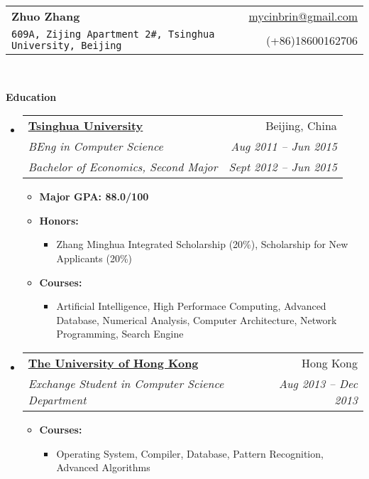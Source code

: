 \documentclass[letterpaper,11pt]{article}
\makeatletter
\newcommand{\resitem}[1]{\item #1 \vspace{-2pt}}
\newcommand{\resheading}[1]{{\large \colorbox{mygrey}{\begin{minipage}{\textwidth}{\textbf{#1 \vphantom{p\^{E}}}}\end{minipage}}}}
\newcommand{\ressubheading}[4]{
\begin{tabular*}{6.5in}{l@{\extracolsep{\fill}}r}
        \textbf{#1} & #2 \\
        \textit{#3} & \textit{#4} \\
\end{tabular*}\vspace{-6pt}}
\newcommand{\ressubheadingg}[6]{
\begin{tabular*}{6.5in}{l@{\extracolsep{\fill}}r}
        \textbf{#1} & #2 \\
        \textit{#3} & \textit{#4} \\
        \textit{#5} & \textit{#6} \\
\end{tabular*}\vspace{-6pt}}
\makeatother
\begin{document}
\newcommand{\mywebheader}{
\begin{tabular*}{7in}{l@{\extracolsep{\fill}}r}
    \textbf{{\LARGE Zhuo Zhang}} & \href{mailto:mycinbrin@gmail.com}{mycinbrin@gmail.com}\\
    {\footnotesize \texttt{609A, Zijing Apartment 2\#, Tsinghua University, Beijing}} & {(+86)18600162706}
    \end{tabular*}
\\
\vspace{0.1in}}

\mywebheader

\resheading{Education}
    \begin{itemize}
            \item
                \ressubheadingg{\href{http://www.tsinghua.edu.cn}{Tsinghua University}}{Beijing, China}{{BEng in Computer Science}}{Aug 2011 -- Jun 2015}{Bachelor of Economics, Second Major}{Sept 2012 -- Jun 2015}
                { \footnotesize
                \begin{itemize}
                        \resitem{\textbf{Major GPA: 88.0/100}}
                        \resitem{\textbf{Honors:}} 
                        \begin{itemize}
                                \resitem{Zhang Minghua Integrated Scholarship (20\%), Scholarship for New Applicants (20\%) }
                        \end{itemize}
						\resitem{\textbf{Courses:}}
						\begin{itemize}
								\resitem{Artificial Intelligence, High Performace Computing, Advanced Database, Numerical Analysis, Computer Architecture, Network Programming, Search Engine}
						\end{itemize}
                \end{itemize}
                }
            \item
                \ressubheading{\href{http://www.hku.hku}{The University of Hong Kong}}{Hong Kong}{Exchange Student in Computer Science Department}{Aug 2013 -- Dec 2013}{}
                { \footnotesize
                \begin{itemize}
                      \resitem{\textbf{Courses:}}
                      \begin{itemize}
							  \resitem{Operating System, Compiler, Database, Pattern Recognition, Advanced Algorithms}
					  \end{itemize}
				\end{itemize}
			    }
    \end{itemize} %
\end{document}
